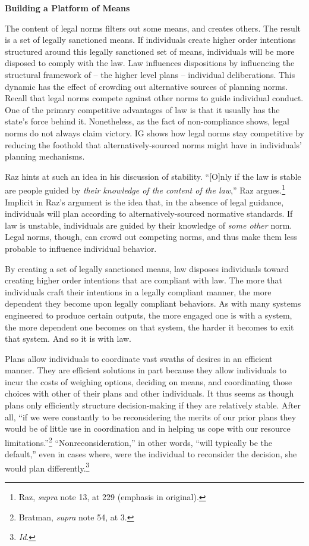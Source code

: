 \textbf{Building a Platform of Means}

The content of legal norms filters out some means, and creates others.
The result is a set of legally sanctioned means. If individuals create
higher order intentions structured around this legally sanctioned set of
means, individuals will be more disposed to comply with the law. Law
influences dispositions by influencing the structural framework of --
the higher level plans -- individual deliberations. This dynamic has the
effect of crowding out alternative sources of planning norms. Recall
that legal norms compete against other norms to guide individual
conduct. One of the primary competitive advantages of law is that it
usually has the state's force behind it. Nonetheless, as the fact of
non-compliance shows, legal norms do not always claim victory. IG shows
how legal norms stay competitive by reducing the foothold that
alternatively-sourced norms might have in individuals' planning
mechanisms.

Raz hints at such an idea in his discussion of stability. ``{[}O{]}nly
if the law is stable are people guided by \emph{their knowledge of the
content of the law},'' Raz argues.\footnote{Raz, \emph{supra} note 13,
  at 229 (emphasis in original).} Implicit in Raz's argument is the idea
that, in the absence of legal guidance, individuals will plan according
to alternatively-sourced normative standards. If law is unstable,
individuals are guided by their knowledge of \emph{some other} norm.
Legal norms, though, can crowd out competing norms, and thus make them
less probable to influence individual behavior.

By creating a set of legally sanctioned means, law disposes individuals
toward creating higher order intentions that are compliant with law. The
more that individuals craft their intentions in a legally compliant
manner, the more dependent they become upon legally compliant behaviors.
As with many systems engineered to produce certain outputs, the more
engaged one is with a system, the more dependent one becomes on that
system, the harder it becomes to exit that system. And so it is with
law.

Plans allow individuals to coordinate vast swaths of desires in an
efficient manner. They are efficient solutions in part because they
allow individuals to incur the costs of weighing options, deciding on
means, and coordinating those choices with other of their plans and
other individuals. It thus seems as though plans only efficiently
structure decision-making if they are relatively stable. After all, ``if
we were constantly to be reconsidering the merits of our prior plans
they would be of little use in coordination and in helping us cope with
our resource limitations.''\footnote{Bratman, \emph{supra} note 54, at
  3.} ``Nonreconsideration,'' in other words, ``will typically be the
default,'' even in cases where, were the individual to reconsider the
decision, she would plan differently.\footnote{\emph{Id}.}

